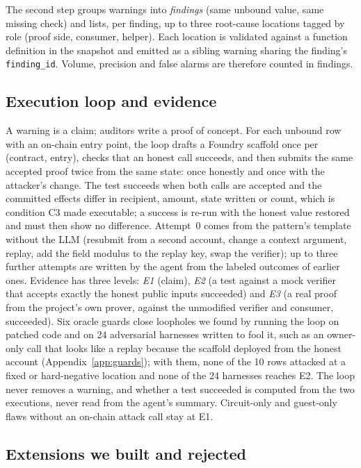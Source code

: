 The second step groups warnings into \emph{findings} (same unbound value,
same missing check) and lists, per finding, up to three root-cause locations
tagged by role (proof side, consumer, helper). Each location is validated
against a function definition in the snapshot and emitted as a sibling
warning sharing the finding's \texttt{finding\_id}. Volume, precision and
false alarms are therefore counted in findings.

\subsection{Execution loop and evidence}\label{sec:design-loop}

A warning is a claim; auditors write a proof of concept. For each unbound
row with an on-chain entry point, the loop drafts a Foundry scaffold once per
(contract, entry), checks that an honest call succeeds, and then submits the
same accepted proof twice from the same state: once honestly and once with
the attacker's change. The test succeeds when both calls are accepted and the
committed effects differ in recipient, amount, state written or count, which
is condition C3 made executable; a success is re-run with the honest value
restored and must then show no difference. Attempt~0 comes from the pattern's
template without the LLM (resubmit from a second account, change a context
argument, replay, add the field modulus to the replay key, swap the verifier);
up to three further attempts are written by the agent from the labeled
outcomes of earlier ones. Evidence has three levels: \emph{E1} (claim),
\emph{E2} (a test against a mock verifier that accepts exactly the honest
public inputs succeeded) and \emph{E3} (a real proof from the project's own
prover, against the unmodified verifier and consumer, succeeded). Six oracle
guards close loopholes we found by running the loop on patched code and on
24 adversarial harnesses written to fool it, such as an owner-only call that
looks like a replay because the scaffold deployed from the honest account
(Appendix~\ref{app:guards}); with them, none of the 10 rows attacked at a
fixed or hard-negative location and none of the 24 harnesses reaches E2. The loop never removes a warning, and
whether a test succeeded is computed from the two executions, never read from
the agent's summary. Circuit-only and guest-only flaws without an on-chain
attack call stay at E1.

\subsection{Extensions we built and rejected}\label{sec:design-ext}

